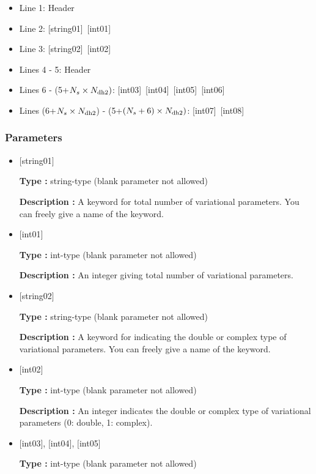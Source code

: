  \begin{itemize}
   \item  Line 1: Header
   \item  Line 2: [string01]~[int01]
   \item  Line 3: [string02]~[int02]
   \item  Lines 4 - 5:  Header
   \item  Lines 6 - (5+$N_s\times N_{\rm dh2})$: [int03]~[int04]~[int05]~[int06]
   \item  Lines (6+$N_s\times N_{\rm dh2}$) - (5+$(N_s+6) \times N_{\rm dh2})$: [int07]~[int08]
  \end{itemize}
\subsubsection{Parameters}
 \begin{itemize}

   \item  $[$string01$]$
   
    {\bf Type :} string-type (blank parameter not allowed)

   {\bf Description :} A keyword for total number of variational parameters. You can freely give a name of the keyword. 

   \item  $[$int01$]$
   
    {\bf Type :} int-type (blank parameter not allowed)

   {\bf Description :} An integer giving total number of variational parameters. 

  \item  $[$string02$]$
   
    {\bf Type :} string-type (blank parameter not allowed)

   {\bf Description :}  A keyword for indicating the double or complex type of variational parameters. You can freely give a name of the keyword.
   
   \item  $[$int02$]$
   
    {\bf Type :} int-type (blank parameter not allowed)

   {\bf Description :} An integer indicates the double or complex type of variational parameters (0: double, 1: complex). 

  \item  $[$int03$]$,  $[$int04$]$, $[$int05$]$
   
 {\bf Type :} int-type (blank parameter not allowed)


\end{itemize}
